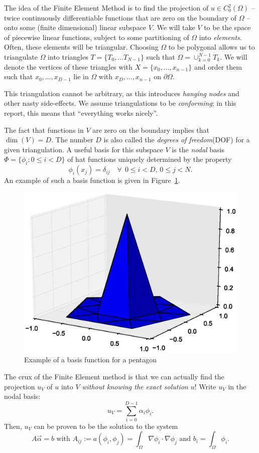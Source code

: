 \documentclass[11pt]{amsart}
\theoremstyle{definition}
\begin{document}
The idea of the Finite Element Method is to find the projection of $u \in C^2_0(\Omega)$ -- twice continuously differentiable functions that are zero on the boundary of $\Omega$ -- onto some (finite dimensional) linear subspace $V$. We will take $V$ to be the space of piecewise linear functions, subject to some partitioning of $\Omega$ into \emph{elements}. Often, these elements will be triangular. Choosing $\Omega$ to be polygonal allows us to triangulate $\Omega$ into triangles $T = \{ T_0, \ldots T_{N-1}\}$ such that $\Omega = \cup_{k = 0}^{N-1}T_k$. We will denote the vertices of these triangles with $X = \{x_0, \ldots, x_{n-1}\}$ and order them such that $x_0, \ldots, x_{D-1}$ lie in $\Omega$ with $x_{D}, \ldots, x_{n-1}$ on $\partial \Omega$.

This triangulation cannot be arbitrary, as this introduces \emph{hanging nodes} and other nasty side-effects. We assume triangulations to be \emph{conforming}; in this report, this means that ``everything works nicely''.

The fact that functions in $V$ are zero on the boundary implies that $\dim(V) = D$. The number $D$ is also called the \emph{degrees of freedom}(DOF) for a given triangulation. A useful basis for this subspace $V$ is the \emph{nodal} basis $\Phi = \{\phi_i: 0 \leq i < D\}$ of hat functions uniquely determined by the property
\[
  \phi_i( x_j) = \delta_{ij} \quad \forall~~0 \leq i < D,\, 0 \leq j < N.
\] An example of such a basis function is given in Figure~\ref{fig:nodal}.
\begin{figure}[h!]
	\centering
	\includegraphics[width=0.5\linewidth]{nodal_vijfhoek.eps}
\caption{Example of a basis function for a pentagon}
\label{fig:nodal}
\end{figure}


The crux of the Finite Element method is that we can actually find the projection $u_V$ of $u$ into $V$ \emph{without knowing the exact solution $u$}! Write $u_V$ in the nodal basis:
\[
  u_V = \sum_{i=0}^{D-1} \alpha_i \phi_i.
\]
Then, $u_V$ can be proven \cite{TODO} to be the solution to the system
\[
	A\vec \alpha = b \text{ with }  A_{ij} := a(\phi_i, \phi_j) = \int_\Omega \nabla \phi_i \cdot \nabla \phi_j \text{ and } b_i = \int_\Omega \phi_i.
\]
\end{document}
